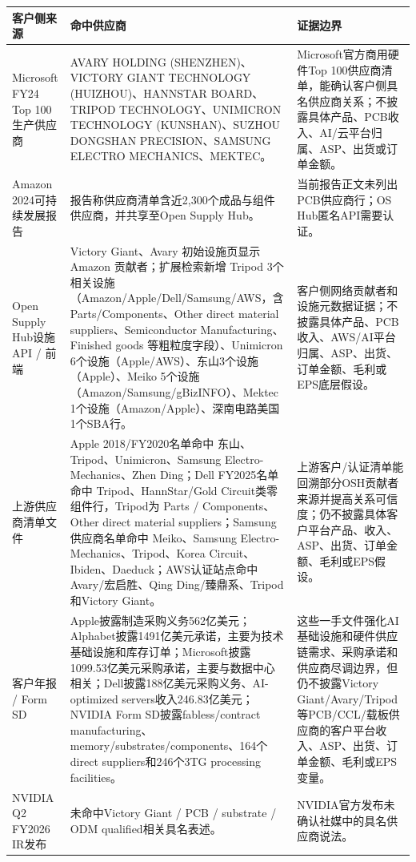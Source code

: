 \begin{exhibitbox}[图表5-13：客户侧官方供应商清单证据]
\footnotesize
\begin{tabularx}{\textwidth}{L{2.7cm}X X}
\toprule
\textbf{客户侧来源} & \textbf{命中供应商} & \textbf{证据边界} \\
\midrule
Microsoft FY24 Top 100生产供应商 & AVARY HOLDING (SHENZHEN)、VICTORY GIANT TECHNOLOGY (HUIZHOU)、HANNSTAR BOARD、TRIPOD TECHNOLOGY、UNIMICRON TECHNOLOGY (KUNSHAN)、SUZHOU DONGSHAN PRECISION、SAMSUNG ELECTRO MECHANICS、MEKTEC。 & Microsoft官方商用硬件Top 100供应商清单，能确认客户侧具名供应商关系；不披露具体产品、PCB收入、AI/云平台归属、ASP、出货或订单金额。 \\
Amazon 2024可持续发展报告 & 报告称供应商清单含近2,300个成品与组件供应商，并共享至Open Supply Hub。 & 当前报告正文未列出PCB供应商行；OS Hub匿名API需要认证。 \\
Open Supply Hub设施API / 前端 & Victory Giant、Avary 初始设施页显示 Amazon 贡献者；扩展检索新增 Tripod 3个相关设施（Amazon/Apple/Dell/Samsung/AWS，含 Parts/Components、Other direct material suppliers、Semiconductor Manufacturing、Finished goods 等粗粒度字段）、Unimicron 6个设施（Apple/AWS）、东山3个设施（Apple）、Meiko 5个设施（Amazon/Samsung/gBizINFO）、Mektec 1个设施（Amazon/Apple）、深南电路美国 1个SBA行。 & 客户侧网络贡献者和设施元数据证据；不披露具体产品、PCB收入、AWS/AI平台归属、ASP、出货、订单金额、毛利或EPS底层假设。 \\
上游供应商清单文件 & Apple 2018/FY2020名单命中 东山、Tripod、Unimicron、Samsung Electro-Mechanics、Zhen Ding；Dell FY2025名单命中 Tripod、HannStar/Gold Circuit类零组件行，Tripod为 Parts / Components、Other direct material suppliers；Samsung供应商名单命中 Meiko、Samsung Electro-Mechanics、Tripod、Korea Circuit、Ibiden、Daeduck；AWS认证站点命中Avary/宏启胜、Qing Ding/臻鼎系、Tripod和Victory Giant。 & 上游客户/认证清单能回溯部分OSH贡献者来源并提高关系可信度；仍不披露具体客户平台产品、收入、ASP、出货、订单金额、毛利或EPS假设。 \\
客户年报 / Form SD & Apple披露制造采购义务562亿美元；Alphabet披露1491亿美元承诺，主要为技术基础设施和库存订单；Microsoft披露1099.53亿美元采购承诺，主要与数据中心相关；Dell披露188亿美元采购义务、AI-optimized servers收入246.83亿美元；NVIDIA Form SD披露fabless/contract manufacturing、memory/substrates/components、164个direct suppliers和246个3TG processing facilities。 & 这些一手文件强化AI基础设施和硬件供应链需求、采购承诺和供应商尽调边界，但仍不披露Victory Giant/Avary/Tripod等PCB/CCL/载板供应商的客户平台收入、ASP、出货、订单金额、毛利或EPS变量。 \\
NVIDIA Q2 FY2026 IR发布 & 未命中Victory Giant / PCB / substrate / ODM qualified相关具名表述。 & NVIDIA官方发布未确认社媒中的具名供应商说法。 \\
\bottomrule
\end{tabularx}
\end{exhibitbox}

